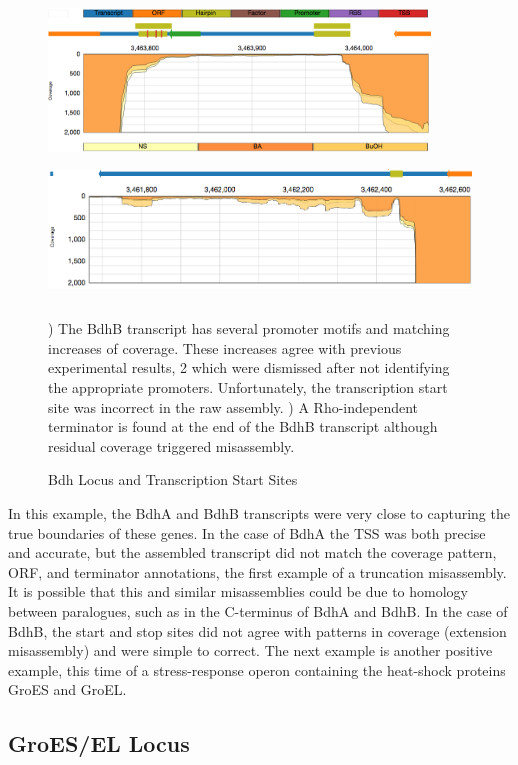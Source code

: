 \begin{figure}
\small
{\includegraphics[width=\textwidth,height=1.5in]{images/Assembly/Examples/Bdh/BdhB-TSS.png}
\label{fig:6a}}
{\includegraphics[width=\textwidth,height=1.5in]{images/Assembly/Examples/Bdh/BdhB-termination.png}
\label{fig:6b}}
\caption{Bdh Locus and Transcription Start Sites}
) The BdhB transcript has several promoter motifs and matching increases of coverage. These increases agree with previous experimental results\cite{73}, 2 which were dismissed after not identifying the appropriate promoters. Unfortunately, the transcription start site was incorrect in the raw assembly. ) A Rho-independent terminator is found at the end of the BdhB transcript although residual coverage triggered misassembly.
\end{figure}

In this example, the BdhA and BdhB transcripts were very close to capturing the true boundaries of these genes. In the case of BdhA the TSS was both precise and accurate, but the assembled transcript did not match the coverage pattern, ORF, and terminator annotations, the first example of a truncation misassembly. It is possible that this and similar misassemblies could be due to homology between paralogues, such as in the C-terminus of BdhA and BdhB. In the case of BdhB, the start and stop sites did not agree with patterns in coverage (extension misassembly) and were simple to correct. The next example is another positive example, this time of a stress-response operon containing the heat-shock proteins GroES and GroEL.

\subsection{GroES/EL Locus}
